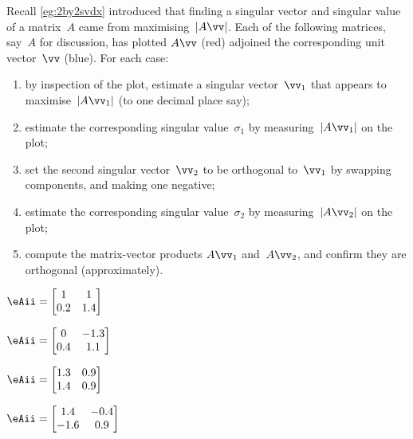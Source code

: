 \begin{exercise} \label{ex:} 
Recall \autoref{eg:2by2svdx} introduced that finding a singular vector and singular value of a matrix~\(A\) came from maximising~\(|A\vv|\).
Each of the following matrices, say~\(A\) for discussion, has plotted \(A\vv\) (red) adjoined the corresponding unit vector~\(\vv\) (blue).
For each case:
\begin{enumerate}
\def\theenumii{\roman{enumii}}
\item by inspection of the plot, estimate a singular vector~\(\vv_1\) that appears to maximise~\(|A\vv_1|\) (to one decimal place say);
\item estimate the corresponding singular value~\(\sigma_1\) by measuring~\(|A\vv_1|\) on the plot;
\item set the second singular vector~\(\vv_2\) to be orthogonal to~\(\vv_1\) by swapping components, and making one negative;
\item estimate the corresponding singular value~\(\sigma_2\) by measuring~\(|A\vv_2|\) on the plot;
\item compute the matrix-vector products \(A\vv_1\) and~\(A\vv_2\), and confirm they are orthogonal (approximately).
\end{enumerate}

\def\eRosesize{small}
\begin{parts}
\item \(\eAii=\begin{bmatrix} 1&1\\0.2&1.4 \end{bmatrix}\) 

\item \(\eAii=\begin{bmatrix} 0&-1.3\\0.4&1.1 \end{bmatrix}\) 

\item \(\eAii=\begin{bmatrix} 1.3&0.9\\1.4&0.9 \end{bmatrix}\) 

\item \(\eAii=\begin{bmatrix} 1.4&-0.4\\-1.6&0.9 \end{bmatrix}\) 

\end{parts}
\end{exercise}






